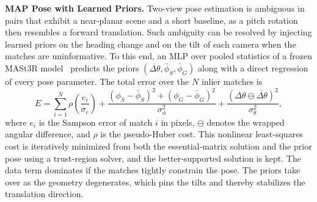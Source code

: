\noindent\textbf{MAP Pose with Learned Priors.}\label{sec:head}
Two-view pose estimation is ambiguous in pairs that exhibit a near-planar scene and a short baseline, as a pitch rotation then resembles a forward translation. Such ambiguity can be resolved by injecting learned priors on the heading change and on the tilt of each camera when the matches are uninformative. To this end, an MLP over pooled statistics of a frozen MASt3R model~\citep{leroy2024mast3r} predicts the priors $(\overline{\Delta\theta},\bar\phi_S,\bar\phi_G)$ along with a direct regression of every pose parameter. The total error over the $N$ inlier matches is
\begin{equation}
E=\sum_{i=1}^{N}\rho\!\left(\frac{e_i}{\sigma_e}\right)
+\frac{(\phi_S-\bar\phi_S)^2+(\phi_G-\bar\phi_G)^2}{\sigma_\phi^2}
+\frac{(\Delta\theta\ominus\overline{\Delta\theta})^2}{\sigma_\theta^2},
\label{eq:map}
\end{equation}
where $e_i$ is the Sampson error of match $i$ in pixels, $\ominus$ denotes the wrapped angular difference, and $\rho$ is the pseudo-Huber cost. This nonlinear least-squares cost is iteratively minimized from both the essential-matrix solution and the prior pose using a trust-region solver, and the better-supported solution is kept. The data term dominates if the matches tightly constrain the pose. The priors take over as the geometry degenerates, which pins the tilts and thereby stabilizes the translation direction.

